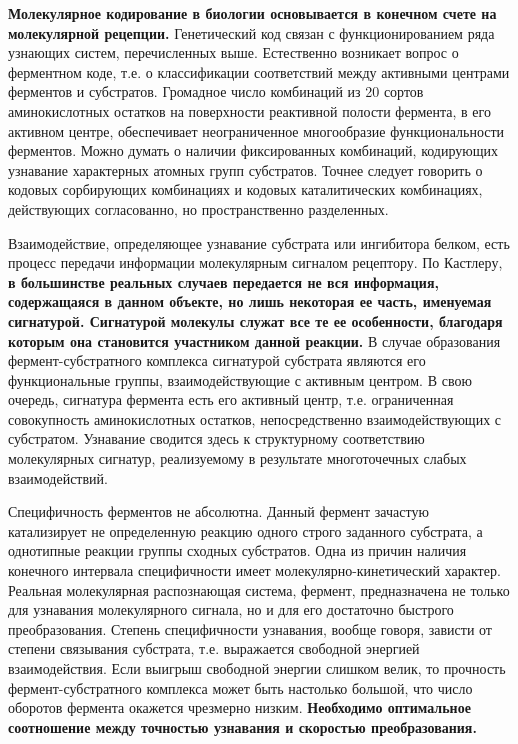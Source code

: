 \documentclass[12pt,a4paper,oneside]{book}
\begin{document}
{\bf Молекулярное кодирование в биологии основывается в конечном счете на молекулярной рецепции.} Генетический код связан с функционированием ряда узнающих систем, перечисленных выше. Естественно возникает вопрос о ферментном коде, т.е. о классификации соответствий между активными центрами ферментов и субстратов. Громадное число комбинаций из 20 сортов аминокислотных остатков на поверхности реактивной полости фермента, в его активном центре, обеспечивает неограниченное многообразие функциональности ферментов. Можно думать о наличии фиксированных комбинаций, кодирующих узнавание характерных атомных групп субстратов. Точнее следует говорить о кодовых сорбирующих комбинациях и кодовых каталитических комбинациях, действующих согласованно, но пространственно разделенных.

Взаимодействие, определяющее узнавание субстрата или ингибитора белком, есть процесс передачи информации молекулярным сигналом рецептору. По Кастлеру, {\bf в большинстве реальных случаев передается не вся информация, содержащаяся в данном объекте, но лишь некоторая ее часть, именуемая сигнатурой. Сигнатурой молекулы служат все те ее особенности, благодаря которым она становится участником данной реакции.} В случае образования фермент-субстратного комплекса сигнатурой субстрата являются его функциональные группы, взаимодействующие с активным центром. В свою очередь, сигнатура фермента есть его активный центр, т.е. ограниченная совокупность аминокислотных остатков, непосредственно взаимодействующих с субстратом. Узнавание сводится здесь к структурному соответствию молекулярных сигнатур, реализуемому в результате многоточечных слабых взаимодействий.

Специфичность ферментов не абсолютна. Данный фермент зачастую катализирует не определенную реакцию одного строго заданного субстрата, а однотипные реакции группы сходных субстратов. Одна из причин наличия конечного интервала специфичности имеет молекулярно-кинетический характер. Реальная молекулярная распознающая система, фермент, предназначена не только для узнавания молекулярного сигнала, но и для его достаточно быстрого преобразования. Степень специфичности узнавания, вообще говоря, зависти от степени связывания субстрата, т.е. выражается свободной энергией взаимодействия. Если выигрыш свободной энергии слишком велик, то прочность фермент-субстратного комплекса может быть настолько большой, что число оборотов фермента окажется чрезмерно низким. {\bf Необходимо оптимальное соотношение между точностью узнавания и скоростью преобразования.}
\end{document}
